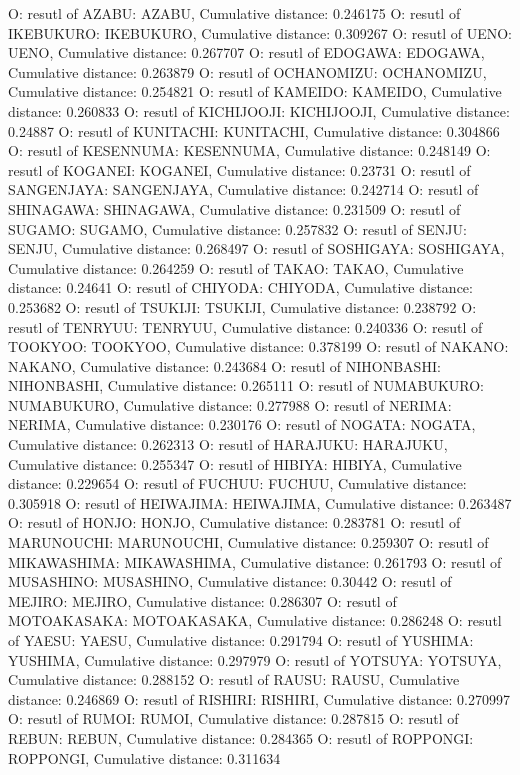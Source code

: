 O: resutl of AZABU: AZABU, Cumulative distance: 0.246175
O: resutl of IKEBUKURO: IKEBUKURO, Cumulative distance: 0.309267
O: resutl of UENO: UENO, Cumulative distance: 0.267707
O: resutl of EDOGAWA: EDOGAWA, Cumulative distance: 0.263879
O: resutl of OCHANOMIZU: OCHANOMIZU, Cumulative distance: 0.254821
O: resutl of KAMEIDO: KAMEIDO, Cumulative distance: 0.260833
O: resutl of KICHIJOOJI: KICHIJOOJI, Cumulative distance: 0.24887
O: resutl of KUNITACHI: KUNITACHI, Cumulative distance: 0.304866
O: resutl of KESENNUMA: KESENNUMA, Cumulative distance: 0.248149
O: resutl of KOGANEI: KOGANEI, Cumulative distance: 0.23731
O: resutl of SANGENJAYA: SANGENJAYA, Cumulative distance: 0.242714
O: resutl of SHINAGAWA: SHINAGAWA, Cumulative distance: 0.231509
O: resutl of SUGAMO: SUGAMO, Cumulative distance: 0.257832
O: resutl of SENJU: SENJU, Cumulative distance: 0.268497
O: resutl of SOSHIGAYA: SOSHIGAYA, Cumulative distance: 0.264259
O: resutl of TAKAO: TAKAO, Cumulative distance: 0.24641
O: resutl of CHIYODA: CHIYODA, Cumulative distance: 0.253682
O: resutl of TSUKIJI: TSUKIJI, Cumulative distance: 0.238792
O: resutl of TENRYUU: TENRYUU, Cumulative distance: 0.240336
O: resutl of TOOKYOO: TOOKYOO, Cumulative distance: 0.378199
O: resutl of NAKANO: NAKANO, Cumulative distance: 0.243684
O: resutl of NIHONBASHI: NIHONBASHI, Cumulative distance: 0.265111
O: resutl of NUMABUKURO: NUMABUKURO, Cumulative distance: 0.277988
O: resutl of NERIMA: NERIMA, Cumulative distance: 0.230176
O: resutl of NOGATA: NOGATA, Cumulative distance: 0.262313
O: resutl of HARAJUKU: HARAJUKU, Cumulative distance: 0.255347
O: resutl of HIBIYA: HIBIYA, Cumulative distance: 0.229654
O: resutl of FUCHUU: FUCHUU, Cumulative distance: 0.305918
O: resutl of HEIWAJIMA: HEIWAJIMA, Cumulative distance: 0.263487
O: resutl of HONJO: HONJO, Cumulative distance: 0.283781
O: resutl of MARUNOUCHI: MARUNOUCHI, Cumulative distance: 0.259307
O: resutl of MIKAWASHIMA: MIKAWASHIMA, Cumulative distance: 0.261793
O: resutl of MUSASHINO: MUSASHINO, Cumulative distance: 0.30442
O: resutl of MEJIRO: MEJIRO, Cumulative distance: 0.286307
O: resutl of MOTOAKASAKA: MOTOAKASAKA, Cumulative distance: 0.286248
O: resutl of YAESU: YAESU, Cumulative distance: 0.291794
O: resutl of YUSHIMA: YUSHIMA, Cumulative distance: 0.297979
O: resutl of YOTSUYA: YOTSUYA, Cumulative distance: 0.288152
O: resutl of RAUSU: RAUSU, Cumulative distance: 0.246869
O: resutl of RISHIRI: RISHIRI, Cumulative distance: 0.270997
O: resutl of RUMOI: RUMOI, Cumulative distance: 0.287815
O: resutl of REBUN: REBUN, Cumulative distance: 0.284365
O: resutl of ROPPONGI: ROPPONGI, Cumulative distance: 0.311634
